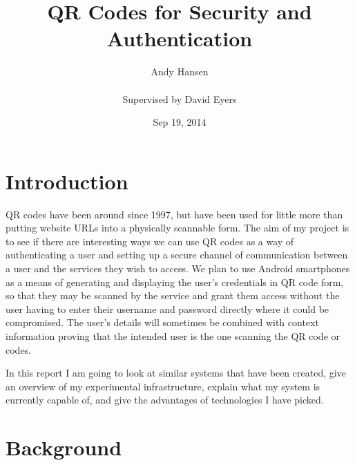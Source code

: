 \documentclass[]{report}   %
\begin{document}
\title{QR Codes for Security and Authentication}
\author{Andy Hansen\\\\
Supervised by David Eyers}
\date{Sep 19, 2014}
\maketitle
\tableofcontents

\section{Introduction}
QR codes have been around since 1997, but have been used for little more than putting website URLs into a physically scannable form. The aim of my project is to see if there are interesting ways we can use QR codes as a way of authenticating a user and setting up a secure channel of communication between a user and the services they wish to access. We plan to use Android smartphones as a means of generating and displaying the user's credentials in QR code form, so that they may be scanned by the service and grant them access without the user having to enter their username and password directly where it could be compromised. The user's details will sometimes be combined with context information proving that the intended user is the one scanning the QR code or codes.

In this report I am going to look at similar systems that have been created, give an overview of my experimental infrastructure, explain what my system is currently capable of, and give the advantages of technologies I have picked.

\section{Background}    
\end{document}
